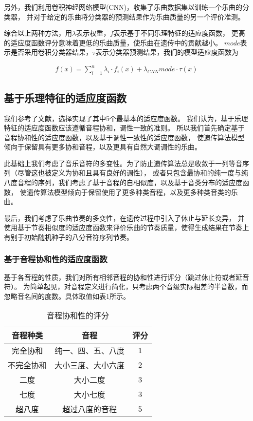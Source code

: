 \documentclass{article}
\begin{document}
另外，我们利用卷积神经网络模型(CNN)，收集了乐曲数据集以训练一个乐曲的分类器，
并对于给定的乐曲将分类器的预测结果作为乐曲质量的另一个评价准测。

综合以上两种方法，用$\lambda$表示权重，$f$表示基于不同乐理特征的适应度函数，
更高的适应度函数评分意味着更低的乐曲质量，使乐曲在遗传中的贡献越小。
$mode$表示是否采用卷积分类器结果，$\tau$表示分类器预测结果，我们的模型适应度函数为

\begin{align}
    f(x)=\sum_{i=1}^{n} \lambda_i \cdot f_i(x) + \lambda_{CNN} mode \cdot \tau(x)
\end{align}


\subsection{基于乐理特征的适应度函数}
我们参考了文献，选择实现了其中5个最基本的适应度函数。
我们认为，基于乐理特征的适应度函数应该遵循音程协和，调性一致的准则。
所以我们首先确定基于音程协和性的适应度函数，以及基于调性一致性的适应度函数，
使遗传算法模型倾向于保留具有更多协和音程，以及更具有自然大调调性的乐曲。

此基础上我们考虑了音乐音符的多变性。为了防止遗传算法总是收敛于一列等音序列（尽管这也被定义为协和且具有良好的调性），
或者只包含最协和的纯一度与纯八度音程的序列，我们考虑了基于音程的自相似度，以及基于音类分布的适应度函数，
使遗传算法模型倾向于保留使用了更多种类音程，以及更多种类音类的乐曲。

最后，我们考虑了乐曲节奏的多变性，在遗传过程中引入了休止与延长变异，
并使用基于节奏相似度的适应度函数来评价乐曲的节奏质量，使得生成结果在节奏上有别于初始随机种子的八分音符序列节奏。

\subsubsection{基于音程协和性的适应度函数}
基于各音程的性质，我们对所有相邻音程的协和性进行评分（跳过休止符或者延音符）。
为简单起见，对音程定义进行简化，只考虑两个音级实际相差的半音数，而忽略音名间的度数。具体取值如表1所示。

\begin{table}[htbp]
    \centering
    \caption{音程协和性的评分}
      \begin{tabular}{ccc}
      \toprule
      音程种类 & 音程 & 评分 \\
      \midrule
      完全协和 & 纯一、四、五、八度 & 1 \\
      不完全协和 & 大小三度、大小六度 & 2 \\
      二度 & 大小二度 & 3 \\
      七度 & 大小七度 & 3 \\
      超八度 & 超过八度的音程 & 5 \\
      \bottomrule
      \end{tabular}
  \end{table}%
\end{document}

